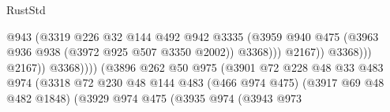 \begin{lexlean}{RustStd}
\begin{coremodule}
                                                            @943
                                                            (@3319
                                                              @226
                                                              @32
                                                              @144
                                                              @492
                                                              @942
                                                              @3335
                                                              (@3959
                                                                @940
                                                                @475
                                                                (@3963
                                                                  @936
                                                                  @938
                                                                  (@3972 @925 @507 @3350 @2002))
                                                                @3368)))
                                                          @2167))
                                                      @3368)))
                                                @2167))
                                            @3368))))
                                    (@3896
                                      @262
                                      @50
                                      @975
                                      (@3901
                                        @72
                                        @228
                                        @48
                                        @33
                                        @483
                                        @974
                                        (@3318
                                          @72
                                          @230
                                          @48
                                          @144
                                          @483
                                          (@466 @974 @475)
                                          (@3917 @69 @48 @482 @1848)
                                          (@3929
                                            @974
                                            @475
                                            (@3935
                                              @974
                                              (@3943
                                                @973

\end{coremodule}
\end{lexlean}
